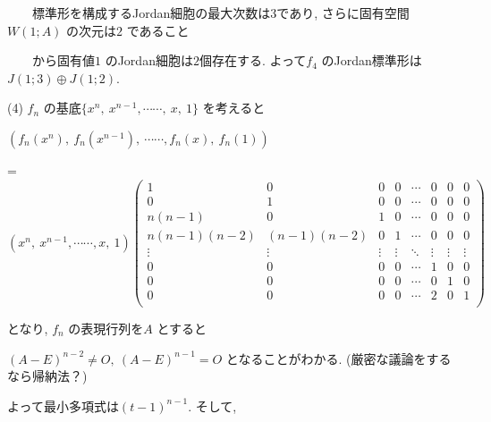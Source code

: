 \documentclass{jsarticle}
\begin{document}
\ \ \ \ 標準形を構成するJordan細胞の最大次数は$3$であり, さらに固有空間$W(1;A)$ の次元は$2$ であること

\ \ \ \ から固有値$1$ のJordan細胞は$2$個存在する. よって$f_4$ のJordan標準形は$J(1;3) \oplus J(1;2)$.

(4) $f_n$ の基底$\{x^n, \ x^{n-1}, \dotsb\dotsb, \ x, \ 1\}$ を考えると

$(f_n(x^n), \ f_n(x^{n-1}), \ \dotsb\dotsb, f_n(x), \ f_n(1))$ 

= $(x^n, \ x^{n-1}, \cdots\cdots, x, \ 1)
\begin{pmatrix} 1 & 0 & 0 & 0 & \dotsb & 0 & 0 & 0 \\
                0 & 1 & 0 & 0 & \dotsb & 0 & 0 & 0 \\
                n(n-1) & 0 & 1 & 0 & \dotsb & 0 & 0 & 0 \\
                n(n-1)(n-2) & (n-1)(n-2) & 0 & 1 & \dotsb & 0 & 0 & 0 \\
                \vdots & \vdots & \vdots & \vdots & \ddots & \vdots & \vdots & \vdots \\
                0 & 0 & 0 & 0 & \cdots & 1 & 0 & 0 \\
                0 & 0 & 0 & 0 & \cdots & 0 & 1 & 0 \\
                0 & 0 & 0 & 0 & \cdots & 2 & 0 & 1 \\
                \end{pmatrix}$

となり, $f_n$ の表現行列を$A$ とすると

$(A-E)^{n-2} \neq O, \ (A-E)^{n-1} = O $ となることがわかる. 
(厳密な議論をするなら帰納法？)

よって最小多項式は$(t-1)^{n-1}$. そして, 
\end{document}
